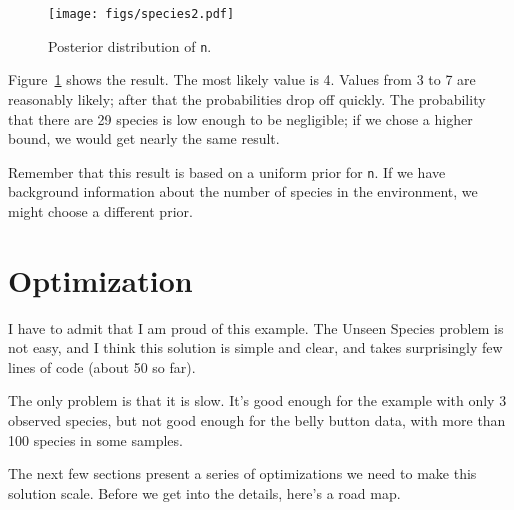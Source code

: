 \documentclass[12pt]{book}
\theoremstyle{exercise}
\begin{document}
\begin{figure}
\centerline{\texttt{[image: figs/species2.pdf]}}
\caption{Posterior distribution of {\tt n}.}
\label{fig.species2}
\end{figure}

Figure~\ref{fig.species2} shows the result.  The most likely value is 4.
Values from 3 to 7 are reasonably likely; after that the probabilities
drop off quickly.  The probability that there are 29 species is
low enough to be negligible; if we chose a higher bound, 
we would get nearly the same result.

Remember that this result is based on a uniform prior for {\tt n}.  If
we have background information about the number of species in the
environment, we might choose a different prior.  


\section{Optimization}

I have to admit that I am proud of this example.  The Unseen Species
problem is not easy, and I think this solution is simple and clear,
and takes surprisingly few lines of code (about 50 so far).

The only problem is that it is slow.  It's good enough for the example
with only 3 observed species, but not good enough for the belly button
data, with more than 100 species in some samples.

The next few sections present a series of optimizations we need to
make this solution scale.  Before we get into the details, here's
a road map.
\end{document}

